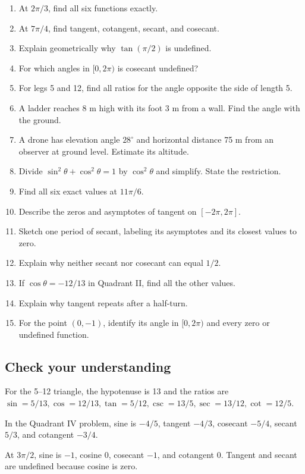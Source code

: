 \begin{enumerate}
\def\labelenumi{\arabic{enumi}.}
\tightlist
\item
  At \(2\pi/3\), find all six functions exactly.
\item
  At \(7\pi/4\), find tangent, cotangent, secant, and cosecant.
\item
  Explain geometrically why \(\tan(\pi/2)\) is undefined.
\item
  For which angles in \([0,2\pi)\) is cosecant undefined?
\item
  For legs 5 and 12, find all ratios for the angle opposite the side of length 5.
\item
  A ladder reaches 8 m high with its foot 3 m from a wall. Find the angle with the ground.
\item
  A drone has elevation angle \(28^\circ\) and horizontal distance 75 m from an observer at ground level. Estimate its altitude.
\item
  Divide \(\sin^2\theta+\cos^2\theta=1\) by \(\cos^2\theta\) and simplify. State the restriction.
\item
  Find all six exact values at \(11\pi/6\).
\item
  Describe the zeros and asymptotes of tangent on \([-2\pi,2\pi]\).
\item
  Sketch one period of secant, labeling its asymptotes and its closest values to zero.
\item
  Explain why neither secant nor cosecant can equal \(1/2\).
\item
  If \(\cos\theta=-12/13\) in Quadrant II, find all the other values.
\item
  Explain why tangent repeats after a half-turn.
\item
  For the point \((0,-1)\), identify its angle in \([0,2\pi)\) and every zero or undefined function.
\end{enumerate}

\hypertarget{m2-check-your-understanding}{%
\subsection{Check your understanding}\label{m2-check-your-understanding}}

For the 5--12 triangle, the hypotenuse is 13 and the ratios are \(\sin=5/13,\cos=12/13,\tan=5/12,\csc=13/5,\sec=13/12,\cot=12/5\).

In the Quadrant IV problem, sine is \(-4/5\), tangent \(-4/3\), cosecant \(-5/4\), secant \(5/3\), and cotangent \(-3/4\).

At \(3\pi/2\), sine is \(-1\), cosine 0, cosecant \(-1\), and cotangent 0. Tangent and secant are undefined because cosine is zero.

\clearpage
